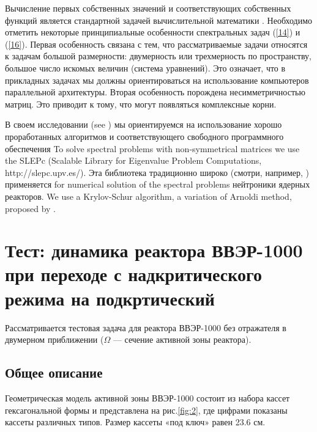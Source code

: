 \documentclass[authoryear]{elsarticle}
\begin{document}
Вычисление первых собственных значений и соответствующих собственных функций является
стандартной задачей вычислительной математики \citep{Saadbook}.
Необходимо отметить некоторые принципиальные особенности спектральных задач (\ref{14}) и (\ref{16}).
Первая особенность связана с тем, что рассматриваемые задачи относятся 
к задачам большой размерности: двумерность или трехмерность по пространству,
большое число искомых величин (система уравнений).  
Это означает, что в прикладных задачах мы должны ориентироваться на использование компьютеров
параллельной архитектуры.
Вторая особенность порождена несимметричностью матриц. 
Это приводит к тому, что могут появляться комплексные корни.

В своем исследовании (see \cite{avvakumov2017spectral,nd-mm}) мы ориентируемся
на использование хорошо проработанных алгоритмов и соответствующего свободного  программного обеспечения
To solve spectral problems with non-symmetrical matrices we use the SLEPc 
(Scalable Library for Eigenvalue Problem Computations, http://slepc.upv.es/). 
Эта библиотека традиционно широко (смотри, например, \cite{hernandez2003resolution,hernandez2005slepc})
применяется for numerical solution of the spectral problems нейтроники ядерных реакторов.  
We use a Krylov-Schur algorithm, a variation of Arnoldi method, proposed by \citep{stewart2002krylov}. 

\section{Тест: динамика реактора ВВЭР-1000 при переходе с надкритического режима на подкртический} 

Рассматривается тестовая задача для реактора ВВЭР-1000 без отражателя \cite{chao} 
в двумерном приближении ($\Omega$ --- сечение активной зоны реактора). 

\subsection{Общее описание} 

Геометрическая модель активной зоны ВВЭР-1000 состоит из набора кассет 
гексагональной формы и представлена на рис.\ref{fig:2}, где цифрами показаны кассеты различных типов.
Размер кассеты «под ключ» равен 23.6 см. 
\end{document}
